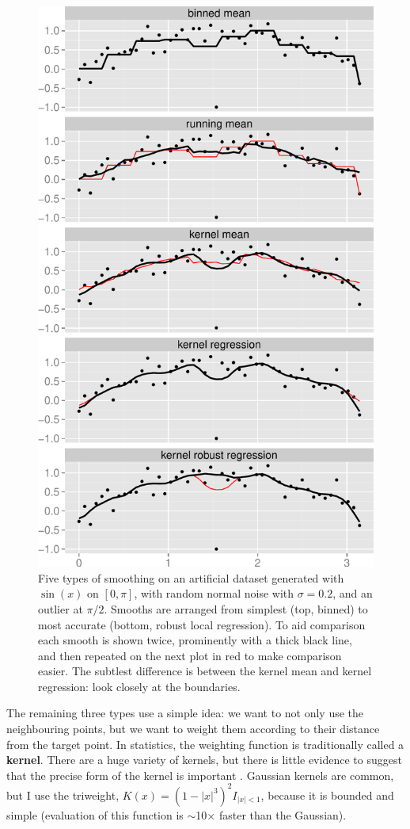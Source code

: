 \documentclass[journal]{vgtc}                %
\begin{document}
\begin{figure}[htb]
 \centering
 \includegraphics[width=0.8\linewidth]{smooth-types}
 \caption{Five types of smoothing on an artificial dataset generated with $\sin(x)$ on $[0, \pi]$, with random normal noise with $\sigma = 0.2$, and an outlier at $\pi / 2$. Smooths are arranged from simplest (top, binned) to most accurate (bottom, robust local regression). To aid comparison each smooth is shown twice, prominently with a thick black line, and then repeated on the next plot in red to make comparison easier. The subtlest difference is between the kernel mean and kernel regression: look closely at the boundaries.}
 \label{fig:smooth-types}
\end{figure}

The remaining three types use a simple idea: we want to not only use the neighbouring points, but we want to weight them according to their distance from the target point. In statistics, the weighting function is traditionally called a {\bf kernel}. There are a huge variety of kernels, but there is little evidence to suggest that the precise form of the kernel is important \citep{cleveland:1996}. Gaussian kernels are common, but I use the triweight, $K(x) = (1 - |x|^3)^2 I_{|x| < 1}$, because it is bounded and simple (evaluation of this function is $\sim$10$\times$ faster than the Gaussian).  
\end{document}
